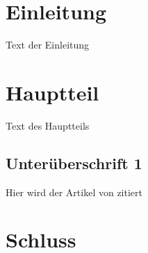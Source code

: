 \documentclass[a4paper, 12pt]{article}
\begin{document}

\setcounter{page}{1}

\section{Einleitung} \label{einleitung}

Text der Einleitung

\section{Hauptteil}

Text des Hauptteils

\subsection{Unterüberschrift 1}

Hier wird der Artikel von \textcite{Abadi.2016} zitiert

\section{Schluss}


\newpage

\end{document}
